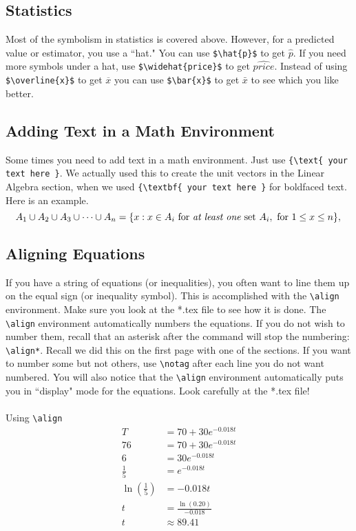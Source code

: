 \documentclass[12pt]{article}
\theoremstyle{definition}
\begin{document}
\subsection{Statistics}
Most of the symbolism in statistics is covered above.  However, for a predicted value or estimator, you use a ``hat."  
You can use \verb!$\hat{p}$! to get $\hat{p}$.  If you need more symbols under a hat, use \verb!$\widehat{price}$! to get $\widehat{price}$.  Instead of using  
\verb!$\overline{x}$! to get $\overline{x}$ you can use \verb!$\bar{x}$! to get $\bar{x}$ to see which you like better.

\subsection{Adding Text in a Math Environment}
Some times you need to add text in a math environment.  Just use \verb!{\text{ your text here }!.  We actually used this to create the unit vectors in the Linear Algebra section, when we used \verb!{\textbf{ your text here }! for boldfaced text.  Here is an example.
\[
A_1 \cup A_2 \cup A_3 \cup \dots \cup A_n =\{x:x\in A_i \text{ for } \textit{at least one } \text{set } A_i, \text{ for } 1\le x \le n \},\\
\]
\subsection{Aligning Equations}
If you have a string of equations (or inequalities), you often want to line them up on the equal sign (or inequality symbol).  This is accomplished with the \verb!\align! environment.  Make sure you look at the *.tex file to see how it is done.  The \verb!\align! environment automatically numbers the equations.  If you do not wish to number them, recall that an asterisk after the command will stop the numbering: \verb!\align*!.  Recall we did this on the first page with one of the sections.  If you want to number some but not others, use \verb!\notag! after each line you do not want numbered.  You will also notice that the \verb!\align! environment automatically puts you in ``display" mode for the equations.  Look carefully at the *.tex file!
\\ \\
Using \verb!\align!
\begin{align}
T&=70+30 e^{-0.018t}\\  %
76&=70+30 e^{-0.018t}\\
6&=30 e^{-0.018t}\\
\frac{1}{5}&=e^{-0.018t}\\
\ln\left(\frac{1}{5}\right)&=-0.018t\\
t&=\frac{\ln(0.20)}{-0.018}\\
t&\approx 89.41
\end{align}
\end{document}
